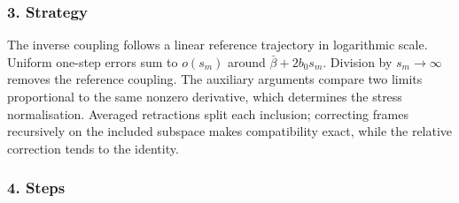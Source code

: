 \documentclass[
  letterpaper,
  11pt]{article}
\begin{document}
\subsubsection{3. Strategy}\label{strategy-29}

The inverse coupling follows a linear reference trajectory in
logarithmic scale. Uniform one-step errors sum to \(o(s_m)\) around
\(\bar\beta+2b_0s_m\). Division by \(s_m\to\infty\) removes the
reference coupling. The auxiliary arguments compare two limits
proportional to the same nonzero derivative, which determines the stress
normalisation. Averaged retractions split each inclusion; correcting
frames recursively on the included subspace makes compatibility exact,
while the relative correction tends to the identity.

\subsubsection{4. Steps}\label{steps-29}
\end{document}
